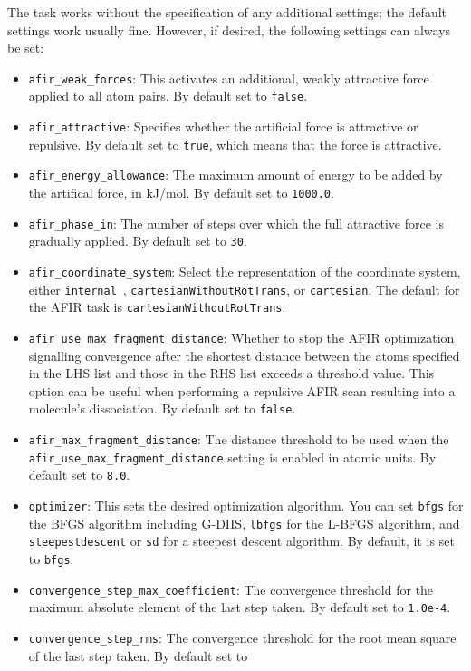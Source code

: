 \documentclass[]{tufte-book}
\begin{document}
The task works without the specification of any additional settings; the default settings work usually fine. However,
if desired, the following settings can always be set:
\begin{itemize}
\item \texttt{afir\_weak\_forces}: This activates an additional, weakly attractive force applied to all atom pairs. By
default set to \texttt{false}.
\item \texttt{afir\_attractive}: Specifies whether the artificial force is attractive or repulsive. By default set to
\texttt{true}, which means that the force is attractive.
\item \texttt{afir\_energy\_allowance}: The maximum amount of energy to be added by the artifical force, in kJ/mol.
By default set to \texttt{1000.0}.
\item \texttt{afir\_phase\_in}: The number of steps over which the full attractive force is gradually applied. By default
set to \texttt{30}.
\item \texttt{afir\_coordinate\_system}: Select the representation of the coordinate system, either \texttt{internal}~\cite{libirc}, \texttt{cartesianWithoutRotTrans}, or \texttt{cartesian}.
The default for the AFIR task is \texttt{cartesianWithoutRotTrans}.
\item \texttt{afir\_use\_max\_fragment\_distance}: Whether to stop the AFIR optimization signalling convergence after
the shortest distance between the atoms specified in the LHS list and those in the RHS list exceeds a threshold value.
This option can be useful when performing a repulsive AFIR scan resulting into a molecule's dissociation. By default
set to \texttt{false}.
\item \texttt{afir\_max\_fragment\_distance}: The distance threshold to be used when the
\texttt{afir\_use\_max\_fragment\_distance} setting is enabled in atomic units. By default set to \texttt{8.0}.
\item \texttt{optimizer}: This sets the desired optimization algorithm. You can set \texttt{bfgs} for the BFGS algorithm including
G-DIIS, \texttt{lbfgs} for the L-BFGS algorithm, and
\texttt{steepestdescent} or \texttt{sd} for a steepest descent algorithm. By default, it is set to \texttt{bfgs}.
\item \texttt{convergence\_step\_max\_coefficient}: The convergence threshold for the maximum absolute element of the last step taken.
By default set to \texttt{1.0e-4}.
\item \texttt{convergence\_step\_rms}: The convergence threshold for the root mean square of the last step taken. By default set to

\end{itemize}
\end{document}
